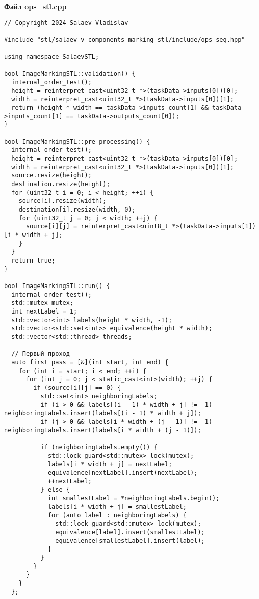 \documentclass[a4paper, 14pt]{article}
\begin{document}
	\textbf{Файл ops\_stl.cpp}
	\begin{verbatim}
// Copyright 2024 Salaev Vladislav

#include "stl/salaev_v_components_marking_stl/include/ops_seq.hpp"

using namespace SalaevSTL;

bool ImageMarkingSTL::validation() {
  internal_order_test();
  height = reinterpret_cast<uint32_t *>(taskData->inputs[0])[0];
  width = reinterpret_cast<uint32_t *>(taskData->inputs[0])[1];
  return (height * width == taskData->inputs_count[1] && taskData->inputs_count[1] == taskData->outputs_count[0]);
}

bool ImageMarkingSTL::pre_processing() {
  internal_order_test();
  height = reinterpret_cast<uint32_t *>(taskData->inputs[0])[0];
  width = reinterpret_cast<uint32_t *>(taskData->inputs[0])[1];
  source.resize(height);
  destination.resize(height);
  for (uint32_t i = 0; i < height; ++i) {
    source[i].resize(width);
    destination[i].resize(width, 0);
    for (uint32_t j = 0; j < width; ++j) {
      source[i][j] = reinterpret_cast<uint8_t *>(taskData->inputs[1])[i * width + j];
    }
  }
  return true;
}

bool ImageMarkingSTL::run() {
  internal_order_test();
  std::mutex mutex;
  int nextLabel = 1;
  std::vector<int> labels(height * width, -1);
  std::vector<std::set<int>> equivalence(height * width);
  std::vector<std::thread> threads;

  // Первый проход
  auto first_pass = [&](int start, int end) {
    for (int i = start; i < end; ++i) {
      for (int j = 0; j < static_cast<int>(width); ++j) {
        if (source[i][j] == 0) {
          std::set<int> neighboringLabels;
          if (i > 0 && labels[(i - 1) * width + j] != -1) neighboringLabels.insert(labels[(i - 1) * width + j]);
          if (j > 0 && labels[i * width + (j - 1)] != -1) neighboringLabels.insert(labels[i * width + (j - 1)]);

          if (neighboringLabels.empty()) {
            std::lock_guard<std::mutex> lock(mutex);
            labels[i * width + j] = nextLabel;
            equivalence[nextLabel].insert(nextLabel);
            ++nextLabel;
          } else {
            int smallestLabel = *neighboringLabels.begin();
            labels[i * width + j] = smallestLabel;
            for (auto label : neighboringLabels) {
              std::lock_guard<std::mutex> lock(mutex);
              equivalence[label].insert(smallestLabel);
              equivalence[smallestLabel].insert(label);
            }
          }
        }
      }
    }
  };


\end{verbatim}
\end{document}
